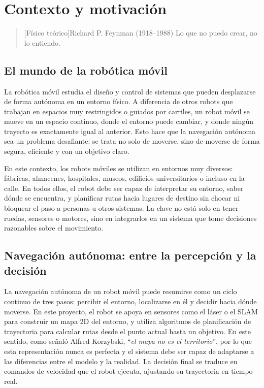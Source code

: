 \chapter{Contexto y motivación}

\begin{quotation}[Físico teórico]{Richard P. Feynman (1918--1988)}
Lo que no puedo crear, no lo entiendo.
\end{quotation}

\begin{abstract}
Antes de construir un edificio, es necesario conocer sus cimientos. Este capítulo presenta el contexto sobre el que se asienta el proyecto.
\end{abstract}

\section{El mundo de la robótica móvil}

La robótica móvil estudia el diseño y control de sistemas que pueden desplazarse de forma autónoma en un entorno físico. A diferencia de otros robots que trabajan en espacios muy restringidos o guiados por carriles, un robot móvil se mueve en un espacio continuo, donde el entorno puede cambiar, y donde ningún trayecto es exactamente igual al anterior. Esto hace que la navegación autónoma sea un problema desafiante: se trata no solo de moverse, sino de moverse de forma segura, eficiente y con un objetivo claro.

En este contexto, los robots móviles se utilizan en entornos muy diversos: fábricas, almacenes, hospitales, museos, edificios universitarios o incluso en la calle. En todos ellos, el robot debe ser capaz de interpretar su entorno, saber dónde se encuentra, y planificar rutas hacia lugares de destino sin chocar ni bloquear el paso a personas u otros sistemas. La clave no está solo en tener ruedas, sensores o motores, sino en integrarlos en un sistema que tome decisiones razonables sobre el movimiento.

\section{Navegación autónoma: entre la percepción y la decisión}

La navegación autónoma de un robot móvil puede resumirse como un ciclo continuo de tres pasos: percibir el entorno, localizarse en él y decidir hacia dónde moverse. En este proyecto, el robot se apoya en sensores como el láser o el SLAM para construir un mapa 2D del entorno, y utiliza algoritmos de planificación de trayectoria para calcular rutas desde el punto actual hasta un objetivo. En este sentido, como señaló Alfred Korzybski, ``\emph{el mapa no es el territorio}''\cite{korzybski1933}, por lo que esta representación nunca es perfecta y el sistema debe ser capaz de adaptarse a las diferencias entre el modelo y la realidad. La decisión final se traduce en comandos de velocidad que el robot ejecuta, ajustando su trayectoria en tiempo real.

